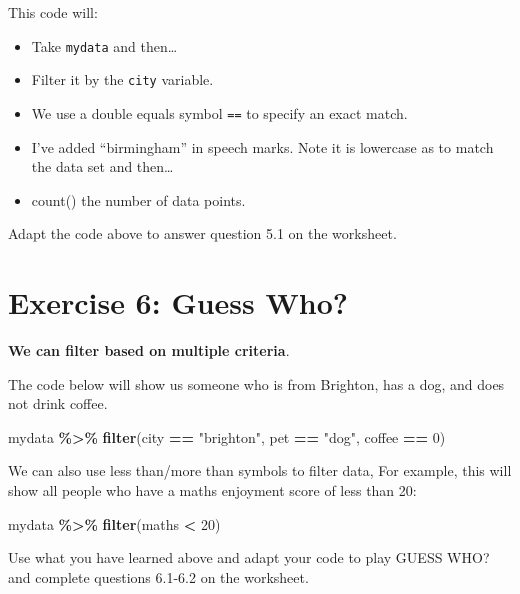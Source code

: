 \documentclass[
]{book}
\newenvironment{Shaded}{\begin{snugshade}}{\end{snugshade}}
\newcommand{\DecValTok}[1]{\textcolor[rgb]{0.00,0.00,0.81}{#1}}
\newcommand{\FunctionTok}[1]{\textcolor[rgb]{0.13,0.29,0.53}{\textbf{#1}}}
\newcommand{\NormalTok}[1]{#1}
\newcommand{\SpecialCharTok}[1]{\textcolor[rgb]{0.81,0.36,0.00}{\textbf{#1}}}
\newcommand{\StringTok}[1]{\textcolor[rgb]{0.31,0.60,0.02}{#1}}
\let\oldsection\section
\renewcommand{\section}{\needspace{5\baselineskip}\oldsection}
\begin{document}
This code will:

\begin{itemize}
\item
  Take \texttt{mydata} and then\ldots{}
\item
  Filter it by the \texttt{city} variable.
\item
  We use a double equals symbol \texttt{==} to specify an exact match.
\item
  I've added ``birmingham'' in speech marks. Note it is lowercase as to match the data set and then\ldots{}
\item
  count() the number of data points.
\end{itemize}

Adapt the code above to answer question 5.1 on the worksheet.

\section{Exercise 6: Guess Who?}\label{exercise-6-guess-who}

\textbf{We can filter based on multiple criteria}.

The code below will show us someone who is from Brighton, has a dog, and does not drink coffee.

\begin{Shaded}
\begin{Highlighting}[]
\NormalTok{mydata }\SpecialCharTok{\%\textgreater{}\%}
  \FunctionTok{filter}\NormalTok{(city }\SpecialCharTok{==} \StringTok{"brighton"}\NormalTok{, pet }\SpecialCharTok{==} \StringTok{"dog"}\NormalTok{, coffee }\SpecialCharTok{==} \DecValTok{0}\NormalTok{)}
\end{Highlighting}
\end{Shaded}

We can also use less than/more than symbols to filter data, For example, this will show all people who have a maths enjoyment score of less than 20:

\begin{Shaded}
\begin{Highlighting}[]
\NormalTok{mydata }\SpecialCharTok{\%\textgreater{}\%}
  \FunctionTok{filter}\NormalTok{(maths }\SpecialCharTok{\textless{}} \DecValTok{20}\NormalTok{)}
\end{Highlighting}
\end{Shaded}

Use what you have learned above and adapt your code to play GUESS WHO? and complete questions 6.1-6.2 on the worksheet.
\end{document}
